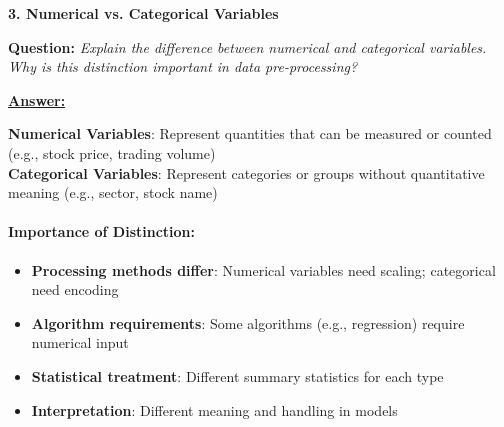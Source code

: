 \documentclass[11pt,a4paper]{article}
\newcommand{\questiontitle}[2]{%
    \vspace{0.4cm}%
    \noindent\textbf{\large\color{headerblue}#1. #2}\par\vspace{0.15cm}%
}
\newcommand{\qprompt}[1]{%
    \noindent\textbf{Question:} \textit{#1}\par\vspace{0.2cm}%
}
\newcommand{\answer}{\noindent\textbf{\underline{Answer:}}\par\vspace{0.15cm}}
\begin{document}
\vspace{0.35cm}

\questiontitle{3}{Numerical vs. Categorical Variables}
\qprompt{Explain the difference between numerical and categorical variables. Why is this distinction important in data pre-processing?}
\answer
\noindent\textbf{Numerical Variables}: Represent quantities that can be measured or counted (e.g., stock price, trading volume)\\[0.3em]
\textbf{Categorical Variables}: Represent categories or groups without quantitative meaning (e.g., sector, stock name)

\paragraph{Importance of Distinction:}
\begin{itemize}
    \item \textbf{Processing methods differ}: Numerical variables need scaling; categorical need encoding
    \item \textbf{Algorithm requirements}: Some algorithms (e.g., regression) require numerical input
    \item \textbf{Statistical treatment}: Different summary statistics for each type
    \item \textbf{Interpretation}: Different meaning and handling in models
\end{itemize}

\vspace{0.35cm}
\end{document}
